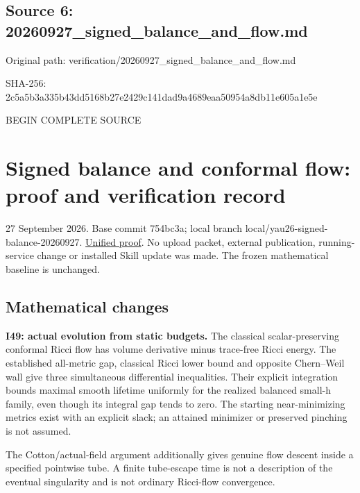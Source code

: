 \documentclass[
  10pt,
]{article}
\begin{document}
\hypertarget{source-6-20260927_signed_balance_and_flow.md}{%
\subsection{Source 6:
20260927\_signed\_balance\_and\_flow.md}\label{source-6-20260927_signed_balance_and_flow.md}}

Original path: verification/20260927\_signed\_balance\_and\_flow.md

SHA-256:
2c5a5b3a335b43dd5168b27e2429c141dad9a4689eaa50954a8db11e605a1e5e

BEGIN COMPLETE SOURCE

\hypertarget{signed-balance-and-conformal-flow-proof-and-verification-record}{%
\section{Signed balance and conformal flow: proof and verification
record}\label{signed-balance-and-conformal-flow-proof-and-verification-record}}

27 September 2026. Base commit 754bc3a; local branch
local/yau26-signed-balance-20260927.
\href{../continuation/20260927_signed_balance_and_conformal_flow.md}{Unified
proof}. No upload packet, external publication, running-service change
or installed Skill update was made. The frozen mathematical baseline is
unchanged.

\hypertarget{mathematical-changes-2}{%
\subsection{Mathematical changes}\label{mathematical-changes-2}}

\textbf{I49: actual evolution from static budgets.} The classical
scalar-preserving conformal Ricci flow has volume derivative minus
trace-free Ricci energy. The established all-metric gap, classical Ricci
lower bound and opposite Chern--Weil wall give three simultaneous
differential inequalities. Their explicit integration bounds maximal
smooth lifetime uniformly for the realized balanced small-h family, even
though its integral gap tends to zero. The starting near-minimizing
metrics exist with an explicit slack; an attained minimizer or preserved
pinching is not assumed.

The Cotton/actual-field argument additionally gives genuine flow descent
inside a specified pointwise tube. A finite tube-escape time is not a
description of the eventual singularity and is not ordinary Ricci-flow
convergence.
\end{document}
